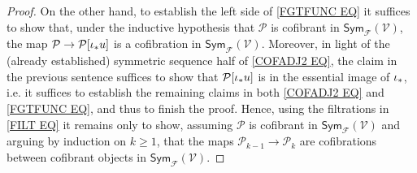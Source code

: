 \documentclass[a4paper,10pt
,draft
]{article}%
\numberwithin{equation}{section}
\numberwithin{figure}{section}
\theoremstyle{definition} %
\newcommand{\1}{\ensuremath{\mathbbm 1}}%
\begin{document}
\begin{proof}
On the other hand, to establish the left side of 
\eqref{FGTFUNC EQ} it suffices to show that,
under the inductive hypothesis that
$\mathcal{P}$ is cofibrant in $\mathsf{Sym}_{\mathcal{F}}(\mathcal{V})$,
the map
$\mathcal{P} \to \mathcal{P}[\iota_{\**} u]$
is a cofibration in $\mathsf{Sym}_{\mathcal{F}}(\mathcal{V})$.
Moreover, in light of the 
(already established)
symmetric sequence half of \eqref{COFADJ2 EQ},
the claim in the previous sentence suffices to show that 
$\mathcal{P}[\iota_{\**} u] $ is in the essential image of $\iota_{\**}$,
i.e. it suffices 
to establish the remaining claims in both
\eqref{COFADJ2 EQ} and \eqref{FGTFUNC EQ},
and thus to finish the proof.
Hence, using the filtrations in
\eqref{FILT EQ}
it remains only to show,
assuming $\mathcal{P}$ is cofibrant in $\mathsf{Sym}_{\mathcal{F}}(\mathcal{V})$
and arguing by induction on $k \geq 1$,
that the maps 
$\mathcal{P}_{k-1} \to \mathcal{P}_k$ 
are cofibrations between cofibrant objects in
$\mathsf{Sym}_{\mathcal{F}}(\mathcal{V})$.



\end{proof}
\end{document}
